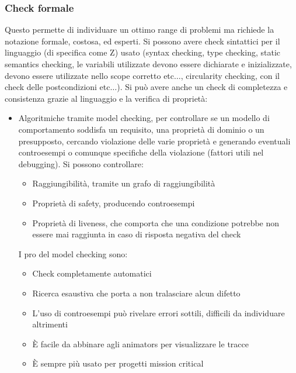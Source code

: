 \subsubsection{Check formale}
Questo permette di individuare un ottimo range di problemi ma richiede la notazione
formale, costosa, ed esperti. Si possono avere check sintattici per il linguaggio
(di specifica come Z) usato (syntax checking, type checking, static semantics
checking, le variabili utilizzate devono essere dichiarate e inizializzate,
devono essere utilizzate nello scope corretto etc$\dots$, circularity checking,
con il check delle postcondizioni etc$\dots$). Si può avere anche un check di
completezza e consistenza grazie al linguaggio e la verifica di proprietà:
\begin{itemize}
      \item Algoritmiche tramite model checking, per controllare se un modello di
            comportamento soddisfa un requisito, una proprietà di dominio o un presupposto,
            cercando violazione delle varie proprietà e generando eventuali controesempi
            o comunque specifiche della violazione (fattori utili nel debugging).
            Si possono controllare:
            \begin{itemize}
                  \item Raggiungibilità, tramite un grafo di raggiungibilità
                  \item Proprietà di safety, producendo controesempi
                  \item Proprietà di liveness, che comporta che una condizione potrebbe
                        non essere mai raggiunta in caso di risposta negativa del check
            \end{itemize}
            I pro del model checking sono:
            \begin{itemize}
                  \item Check completamente automatici
                  \item Ricerca esaustiva che porta a non tralasciare alcun difetto
                  \item L'uso di controesempi può rivelare errori sottili, difficili
                        da individuare altrimenti
                  \item È facile da abbinare agli animators per visualizzare le tracce
                  \item È sempre più usato per progetti mission critical
            \end{itemize}

\end{itemize}
